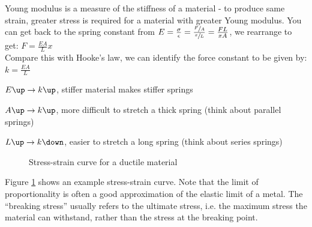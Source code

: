 \documentclass[a4paper,12pt]{book}
\newcounter{example}[chapter]
\newcommand{\titem}{\item}
\newcommand{\ra}{\rightarrow}
\begin{document}
Young modulus is a measure of the stiffness of a material - to produce same strain, greater stress is required for a material with greater Young modulus. You can get back to the spring constant from $E = \frac{\sigma}{\epsilon} = \frac{\sfrac{F}{A}}{\sfrac{x}{L}} = \frac{FL}{xA}$, we rearrange to get: $F = \frac{EA}{L}x$\\

Compare this with Hooke's law, we can identify the force constant to be given by: $k = \frac{EA}{L} $

\titem $E \up \ra k \up$, stiffer material makes stiffer springs

\titem $A \up \ra k \up$, more difficult to stretch a thick spring (think about parallel springs)

\titem $L \up \ra k \down$, easier to stretch a long spring (think about series springs)
\newpage

\begin{figure}[ht]
    \begin{center}
    \end{center}
    \caption{Stress-strain curve for a ductile material}
    \label{stress-strain}
\end{figure}

Figure \ref{stress-strain} shows an example stress-strain curve. Note that the limit of proportionality is often a good approximation of the elastic limit of a metal. The ``breaking stress'' usually refers to the ultimate stress, i.e. the maximum stress the material can withstand, rather than the stress at the breaking point.
\end{document}
